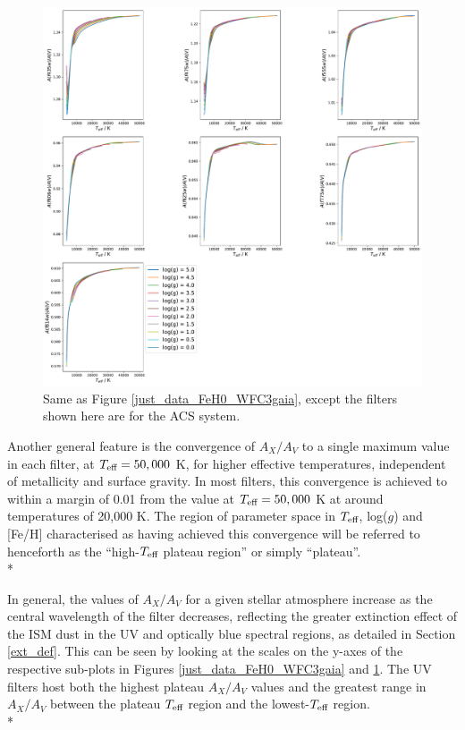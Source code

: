 \documentclass[12pt, a4paper]{report}
\begin{document}
\begin{figure}[h!]
\begin{center}
\includegraphics[width=1.0\textwidth]{../just_full_data/ACS/AHub_FeH0p0_just_Teff_plot_lines.pdf}
\caption{Same as Figure \ref{just_data_FeH0_WFC3gaia}, except the filters shown here are for the ACS system.}
\label{just_data_FeH0_ACS}
\end{center}
\end{figure}

Another general feature is the convergence of $A_{X}/A_{V}$ to a single maximum value in each filter, at $T_{\textnormal{eff}} = 50,000$ K, for higher effective temperatures, independent of metallicity and surface gravity. In most filters, this convergence is achieved to within a margin of 0.01 from the value at $T_{\textnormal{eff}} = 50,000$ K at around temperatures of 20,000 K. The region of parameter space in $T_{\textnormal{eff}}$, log($g$) and [Fe/H] characterised as having achieved this convergence will be referred to henceforth as the ``high-$T_{\textnormal{eff}}$ plateau region'' or simply ``plateau''.\\*

In general, the values of $A_{X}/A_{V}$ for a given stellar atmosphere increase as the central wavelength of the filter decreases, reflecting the greater extinction effect of the ISM dust in the UV and optically blue spectral regions, as detailed in Section \ref{ext_def}. This can be seen by looking at the scales on the y-axes of the respective sub-plots in Figures \ref{just_data_FeH0_WFC3gaia} and \ref{just_data_FeH0_ACS}. The UV filters host both the highest plateau $A_{X}/A_{V}$ values and the greatest range in $A_{X}/A_{V}$ between the plateau $T_{\textnormal{eff}}$ region and the lowest-$T_{\textnormal{eff}}$ region. \\*
\end{document}

